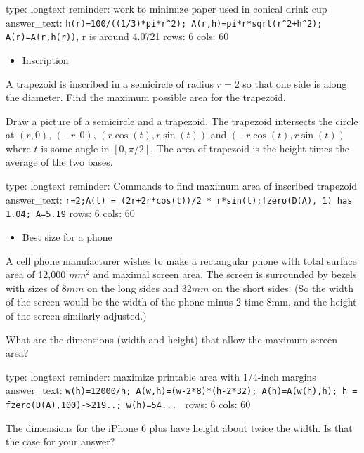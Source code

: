 \documentclass[12pt]{article}
\begin{document}
\begin{answer}
type: longtext
reminder: work to minimize paper used in conical drink cup
answer_text: \verb#h(r)=100/((1/3)*pi*r^2); A(r,h)=pi*r*sqrt(r^2+h^2); A(r)=A(r,h(r))#, r is around 4.0721 
rows: 6
cols: 60
\end{answer}

\begin{itemize}
\itemsep1pt\parskip0pt
\item
  Inscription
\end{itemize}

A trapezoid is inscribed in a semicircle of radius $r=2$ so that one
side is along the diameter. Find the maximum possible area for the
trapezoid.

Draw a picture of a semicircle and a trapezoid. The trapezoid intersects
the circle at $(r,0)$, $(-r,0)$, $(r \cos(t), r\sin(t))$ and
$(-r\cos(t), r\sin(t))$ where $t$ is some angle in $[0, \pi/2]$. The
area of trapezoid is the height times the average of the two bases.

\begin{answer}
type: longtext
reminder: Commands to find maximum area of inscribed trapezoid
answer_text: \verb#r=2;A(t) = (2r+2r*cos(t))/2 * r*sin(t);fzero(D(A), 1) has 1.04; A=5.19# 
rows: 6
cols: 60
\end{answer}

\begin{itemize}
\itemsep1pt\parskip0pt
\item
  Best size for a phone
\end{itemize}

A cell phone manufacturer wishes to make a rectangular phone with total
surface area of 12,000 $mm^2$ and maximal screen area. The screen is
surrounded by bezels with sizes of 8$mm$ on the long sides and 32$mm$ on
the short sides. (So the width of the screen would be the width of the
phone minus 2 time 8mm, and the height of the screen similarly
adjusted.)

What are the dimensions (width and height) that allow the maximum screen
area?

\begin{answer}
type: longtext
reminder: maximize printable area with 1/4-inch margins
answer_text: \verb+w(h)=12000/h; A(w,h)=(w-2*8)*(h-2*32); A(h)=A(w(h),h); h = fzero(D(A),100)->219..; w(h)=54... + 
rows: 6
cols: 60
\end{answer}

The dimensions for the iPhone 6 plus have height about twice the width.
Is that the case for your answer?
\end{document}
